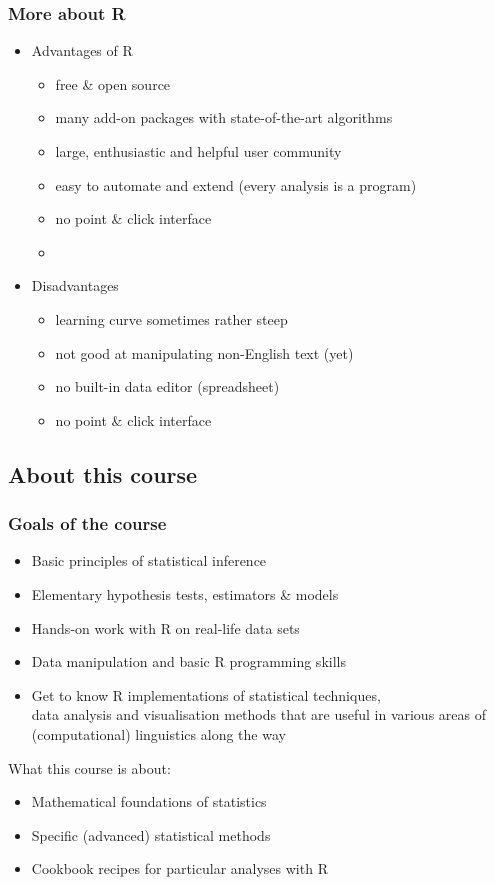 \documentclass[t]{beamer} %
\begin{document}
\begin{frame}
  \frametitle{More about \textbf{R}}
  
  \begin{itemize}
  \item Advantages of R
    \begin{itemize}
    \item free \& open source
    \item many add-on packages with state-of-the-art algorithms
    \item large, enthusiastic and helpful user community
    \item easy to automate and extend (every analysis is a program)
    \item no point \& click interface
    \item[]
    \end{itemize}
  \item<2-> Disadvantages
    \begin{itemize}
    \item learning curve sometimes rather steep
    \item not good at manipulating non-English text (yet)
    \item no built-in data editor (spreadsheet)
    \item no point \& click interface
    \end{itemize}
  \end{itemize}
\end{frame}

\subsection{About this course}

\begin{frame}
  \frametitle{Goals of the course}

  \begin{itemize}
  \item Basic principles of statistical inference
  \item Elementary hypothesis tests, estimators \& models
  \item Hands-on work with R on real-life data sets
  \item Data manipulation and basic R programming skills
  \item Get to know R implementations of statistical techniques,\\
    data analysis and visualisation methods that are useful in various areas
    of (computational) linguistics along the way
  \end{itemize}

  \pause\gap
  What this course is \emph{} about:
  \begin{itemize}
  \item Mathematical foundations of statistics
  \item Specific (advanced) statistical methods
  \item Cookbook recipes for particular analyses with R
  \end{itemize}

\end{frame}
\end{document}
